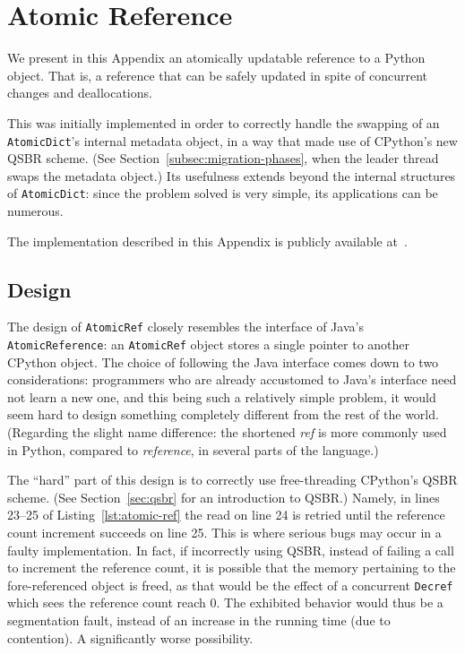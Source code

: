 \chapter{Atomic Reference}\label{ch:atomic-reference}

We present in this Appendix an atomically updatable reference to a Python object.
That is, a reference that can be safely updated in spite of concurrent changes and deallocations.

This was initially implemented in order to correctly handle the swapping of an \texttt{AtomicDict}'s internal metadata object, in a way that made use of CPython's new QSBR scheme.
(See Section~\ref{subsec:migration-phases}, when the leader thread swaps the metadata object.)
Its usefulness extends beyond the internal structures of \texttt{AtomicDict}: since the problem solved is very simple, its applications can be numerous.

The implementation described in this Appendix is publicly available at~\cite[src/cereggii/atomic\_ref.c]{cereggii}.


\section{Design}\label{sec:design}

The design of \texttt{AtomicRef} closely resembles the interface of Java's \texttt{Atomic\-Reference}: an \texttt{AtomicRef} object stores a single pointer to another CPython object.
The choice of following the Java interface comes down to two considerations: programmers who are already accustomed to Java's interface need not learn a new one, and this being such a relatively simple problem, it would seem hard to design something completely different from the rest of the world.
(Regarding the slight name difference: the shortened \emph{ref} is more commonly used in Python, compared to \emph{reference}, in several parts of the language.)

The ``hard'' part of this design is to correctly use free-threading CPython's QSBR scheme.
(See Section~\ref{sec:qsbr} for an introduction to QSBR.)
Namely, in lines 23--25 of Listing~\ref{lst:atomic-ref} the read on line 24 is retried until the reference count increment succeeds on line 25.
This is where serious bugs may occur in a faulty implementation.
In fact, if incorrectly using QSBR, instead of failing a call to increment the reference count, it is possible that the memory pertaining to the fore-referenced object is freed, as that would be the effect of a concurrent \texttt{Decref} which sees the reference count reach 0.
The exhibited behavior would thus be a segmentation fault, instead of an increase in the running time (due to contention).
A significantly worse possibility.

